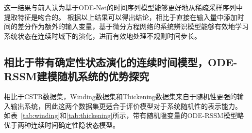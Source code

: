 这一结果与前人认为基于ODE-Net的时间序列模型能够更好地从稀疏采样序列中提取特征是吻合的\cite{Quaglino2019}。
根据以上结果可以得出结论，相比于直接在输入量中添加时间的差分作为额外的输入变量，基于微分方程网络的系统辨识模型能够有效地学习系统状态在连续时域下的演化，进而有效地处理不规则时间步长。

\subsection{相比于带有确定性状态演化的连续时间模型，ODE-RSSM建模随机系统的优势探究}


相比于CSTR数据集，Winding数据集和Thickening数据集来自于随机性更强的输入输出系统，因此这两个数据集更适合于评价模型对于系统随机性的表示能力。
如表~\ref{tab:winding}和\ref{tab:thickening}所示，带有随机隐变量的ODE-RSSM模型略优于两种连续时间确定性隐状态模型。

